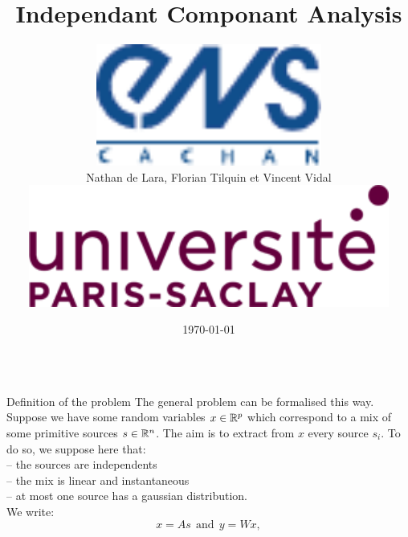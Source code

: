 \documentclass{beamer}
\title{Independant Componant Analysis}
\author[Lara, Tilquin, Vidal]
{
	\parbox{.25\textwidth}{\includegraphics[height=4cm]{ENS_cachan.pdf}}%
	\parbox{.5\textwidth}{\hfil \huge Nathan de Lara, Florian Tilquin et Vincent Vidal \hfil}%
	\parbox{.25\textwidth}{\hspace{8cm} \includegraphics[height=4cm]{UPS.png}}%
}
\institute[Université Paris-Saclay]{Master Mathématiques, Vision et Apprentissage, ENS Cachan}
\date{\today}
\begin{document}
\begin{frame}{}
	\maketitle
\begin{columns}[T]
\begin{column}{.48\linewidth}
\begin{block}{Definition of the problem}
The general problem can be formalised this way.
Suppose we have some random variables $x\in\mathbb{R}^p$ which correspond to
a mix of some primitive sources $s\in\mathbb{R}^n$. The aim is to extract
from $x$ every source $s_i$. To do so, we suppose here that:\\
-- the sources are independents\\
-- the mix is linear and instantaneous\\
-- at most one source has a gaussian distribution.\\
We write:
\begin{equation}
 x = A s \ \ \mbox{and} \ \ y = W x,
\end{equation}


\end{block}
\end{column}
\end{columns}
\end{frame}
\end{document}
